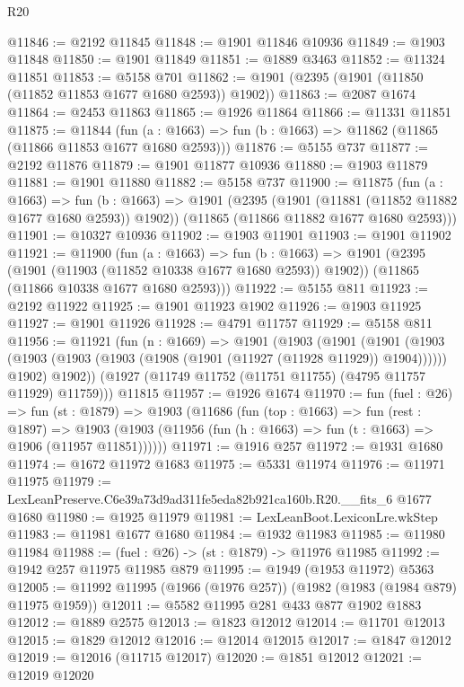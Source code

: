 \begin{lexlean}{R20}
\begin{coremodule}
@11846 := @2192 @11845
@11848 := @1901 @11846 @10936
@11849 := @1903 @11848
@11850 := @1901 @11849
@11851 := @1889 @3463
@11852 := @11324 @11851
@11853 := @5158 @701
@11862 := @1901 (@2395 (@1901 (@11850 (@11852 @11853 @1677 @1680 @2593)) @1902))
@11863 := @2087 @1674
@11864 := @2453 @11863
@11865 := @1926 @11864
@11866 := @11331 @11851
@11875 := @11844
    (fun (a : @1663) => fun (b : @1663) => @11862 (@11865 (@11866 @11853 @1677 @1680 @2593)))
@11876 := @5155 @737
@11877 := @2192 @11876
@11879 := @1901 @11877 @10936
@11880 := @1903 @11879
@11881 := @1901 @11880
@11882 := @5158 @737
@11900 := @11875
    (fun (a : @1663) =>
    fun (b : @1663) =>
    @1901
      (@2395 (@1901 (@11881 (@11852 @11882 @1677 @1680 @2593)) @1902))
      (@11865 (@11866 @11882 @1677 @1680 @2593)))
@11901 := @10327 @10936
@11902 := @1903 @11901
@11903 := @1901 @11902
@11921 := @11900
    (fun (a : @1663) =>
    fun (b : @1663) =>
    @1901
      (@2395 (@1901 (@11903 (@11852 @10338 @1677 @1680 @2593)) @1902))
      (@11865 (@11866 @10338 @1677 @1680 @2593)))
@11922 := @5155 @811
@11923 := @2192 @11922
@11925 := @1901 @11923 @1902
@11926 := @1903 @11925
@11927 := @1901 @11926
@11928 := @4791 @11757
@11929 := @5158 @811
@11956 := @11921
    (fun (n : @1669) =>
    @1901
      (@1903
        (@1901
          (@1901
            (@1903 (@1903 (@1903 (@1903 (@1908 (@1901 (@11927 (@11928 @11929)) @1904))))))
            @1902)
          @1902))
      (@1927 (@11749 @11752 (@11751 @11755) (@4795 @11757 @11929) @11759)))
    @11815
@11957 := @1926 @1674
@11970 := fun (fuel : @26) =>
  fun (st : @1879) =>
  @1903
    (@11686
      (fun (top : @1663) =>
      fun (rest : @1897) =>
      @1903 (@1903 (@11956 (fun (h : @1663) => fun (t : @1663) => @1906 (@11957 @11851))))))
@11971 := @1916 @257
@11972 := @1931 @1680
@11974 := @1672 @11972 @1683
@11975 := @5331 @11974
@11976 := @11971 @11975
@11979 := LexLeanPreserve.C6e39a73d9ad311fe5eda82b921ca160b.R20.__fits_6 @1677 @1680
@11980 := @1925 @11979
@11981 := LexLeanBoot.LexiconLre.wkStep
@11983 := @11981 @1677 @1680
@11984 := @1932 @11983
@11985 := @11980 @11984
@11988 := (fuel : @26) -> (st : @1879) -> @11976 @11985
@11992 := @1942 @257 @11975 @11985 @879
@11995 := @1949 (@1953 @11972) @5363
@12005 := @11992 @11995 (@1966 (@1976 @257)) (@1982 (@1983 (@1984 @879) @11975 @1959))
@12011 := @5582 @11995 @281 @433 @877 @1902 @1883
@12012 := @1889 @2575
@12013 := @1823 @12012
@12014 := @11701 @12013
@12015 := @1829 @12012
@12016 := @12014 @12015
@12017 := @1847 @12012
@12019 := @12016 (@11715 @12017)
@12020 := @1851 @12012
@12021 := @12019 @12020

\end{coremodule}
\end{lexlean}
